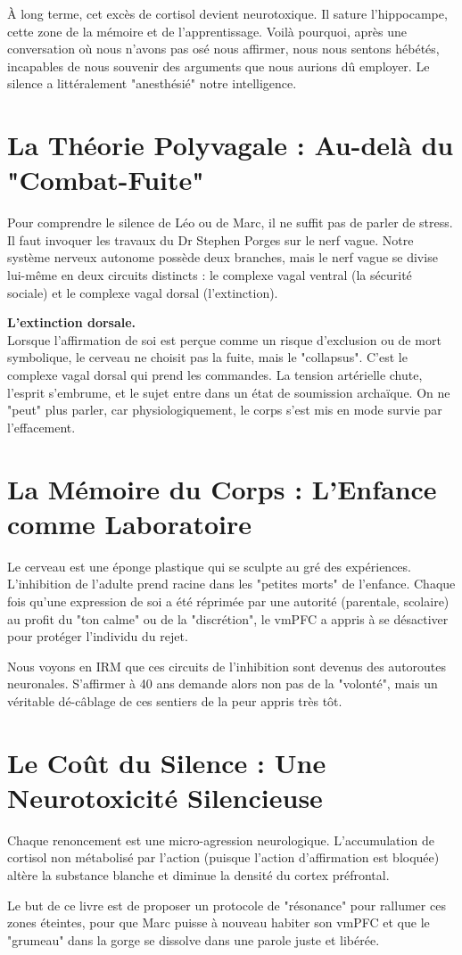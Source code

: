 \documentclass[11.5pt,a4paper]{book}
\begin{document}
À long terme, cet excès de cortisol devient neurotoxique. Il sature l'hippocampe, cette zone de la mémoire et de l'apprentissage. Voilà pourquoi, après une conversation où nous n'avons pas osé nous affirmer, nous nous sentons hébétés, incapables de nous souvenir des arguments que nous aurions dû employer. Le silence a littéralement "anesthésié" notre intelligence.

\section{La Théorie Polyvagale : Au-delà du "Combat-Fuite"}
Pour comprendre le silence de Léo ou de Marc, il ne suffit pas de parler de stress. Il faut invoquer les travaux du Dr Stephen Porges sur le nerf vague. Notre système nerveux autonome possède deux branches, mais le nerf vague se divise lui-même en deux circuits distincts : le complexe vagal ventral (la sécurité sociale) et le complexe vagal dorsal (l'extinction).

\begin{NoteClinique}
\textbf{L'extinction dorsale.} \\
Lorsque l'affirmation de soi est perçue comme un risque d'exclusion ou de mort symbolique, le cerveau ne choisit pas la fuite, mais le "collapsus". C'est le complexe vagal dorsal qui prend les commandes. La tension artérielle chute, l'esprit s'embrume, et le sujet entre dans un état de soumission archaïque. On ne "peut" plus parler, car physiologiquement, le corps s'est mis en mode survie par l'effacement.
\end{NoteClinique}

\section{La Mémoire du Corps : L'Enfance comme Laboratoire}
Le cerveau est une éponge plastique qui se sculpte au gré des expériences. L'inhibition de l'adulte prend racine dans les "petites morts" de l'enfance. Chaque fois qu'une expression de soi a été réprimée par une autorité (parentale, scolaire) au profit du "ton calme" ou de la "discrétion", le vmPFC a appris à se désactiver pour protéger l'individu du rejet. 

Nous voyons en IRM que ces circuits de l'inhibition sont devenus des autoroutes neuronales. S'affirmer à 40 ans demande alors non pas de la "volonté", mais un véritable dé-câblage de ces sentiers de la peur appris très tôt.

\section{Le Coût du Silence : Une Neurotoxicité Silencieuse}
Chaque renoncement est une micro-agression neurologique. L'accumulation de cortisol non métabolisé par l'action (puisque l'action d'affirmation est bloquée) altère la substance blanche et diminue la densité du cortex préfrontal. 

Le but de ce livre est de proposer un protocole de "résonance" pour rallumer ces zones éteintes, pour que Marc puisse à nouveau habiter son vmPFC et que le "grumeau" dans la gorge se dissolve dans une parole juste et libérée.
\end{document}
